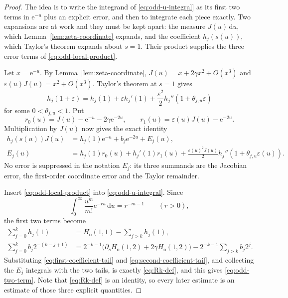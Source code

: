 \documentclass[11pt]{amsart}
\theoremstyle{plain}
\theoremstyle{definition}
\newcommand{\e}{\mathrm e}
\newcommand{\dd}{\,\mathrm d}
\begin{document}
\begin{proof}
The idea is to write the integrand of \eqref{eq:odd-u-integral} as its first
two terms in $\e^{-u}$ plus an explicit error, and then to integrate each
piece exactly. Two expansions are at work and they must be kept apart: the
measure $J(u)\dd u$, which Lemma~\ref{lem:zeta-coordinate} expands, and the
coefficient $h_j(s(u))$, which Taylor's theorem expands about $s=1$. Their
product supplies the three error terms of \eqref{eq:odd-local-product}.

Let $x=\e^{-u}$. By Lemma~\ref{lem:zeta-coordinate},
$J(u)=x+2\gamma x^2+O(x^3)$ and
$\varepsilon(u)J(u)=x^2+O(x^3)$. Taylor's theorem at $s=1$ gives
\[
  h_j(1+\varepsilon)
   =h_j(1)+\varepsilon h_j'(1)
     +\frac{\varepsilon^2}{2}h_j''(1+\theta_{j,u}\varepsilon)
\]
for some $0<\theta_{j,u}<1$. Put
\[
 r_0(u)=J(u)-\e^{-u}-2\gamma\e^{-2u},
 \qquad
 r_1(u)=\varepsilon(u)J(u)-\e^{-2u}.
\]
Multiplication by $J(u)$ now gives the exact identity
\begin{equation}\label{eq:odd-local-product}
\begin{aligned}
 h_j(s(u))J(u)
  &=h_j(1)\e^{-u}+b_j\e^{-2u}+E_j(u),\\
 E_j(u)
  &=h_j(1)r_0(u)+h_j'(1)r_1(u)
    +\frac{\varepsilon(u)^2J(u)}2
       h_j''(1+\theta_{j,u}\varepsilon(u)).
\end{aligned}
\end{equation}
No error is suppressed in the notation $E_j$: its three summands are the
Jacobian error, the first-order coordinate error and the Taylor remainder.

Insert \eqref{eq:odd-local-product} into \eqref{eq:odd-u-integral}. Since
\[
  \int_0^\infty\frac{u^m}{m!}\e^{-ru}\dd u=r^{-m-1}
  \qquad(r>0),
\]
the first two terms become
\begin{align}
 \sum_{j=0}^k h_j(1)
   &=H_{\mathrm o}(1,1)-\sum_{j>k}h_j(1),
   \label{eq:first-coefficient-tail}\\
 \sum_{j=0}^k b_j2^{-(k-j+1)}
   &=2^{-k-1}\bigl(\partial_sH_{\mathrm o}(1,2)
                    +2\gamma H_{\mathrm o}(1,2)\bigr)
     -2^{-k-1}\sum_{j>k}b_j2^j.
   \label{eq:second-coefficient-tail}
\end{align}
Substituting \eqref{eq:first-coefficient-tail} and
\eqref{eq:second-coefficient-tail}, and collecting the $E_j$ integrals with the
two tails, is exactly \eqref{eq:Rk-def}, and this gives
\eqref{eq:odd-two-term}. Note that \eqref{eq:Rk-def} is an identity, so every
later estimate is an estimate of those three explicit quantities.
\end{proof}
\end{document}
